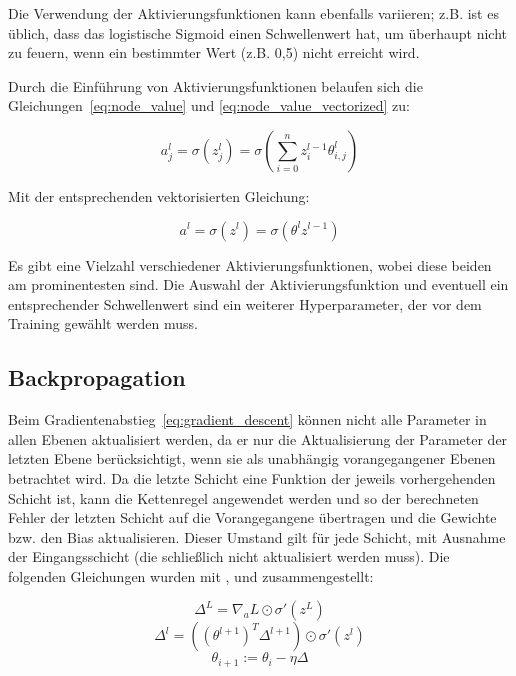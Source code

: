 Die Verwendung der Aktivierungsfunktionen kann ebenfalls variieren; z.B. ist es üblich, dass das logistische Sigmoid einen Schwellenwert hat, um überhaupt nicht zu feuern, wenn ein bestimmter Wert (z.B. 0,5) nicht erreicht wird.

Durch die Einführung von Aktivierungsfunktionen belaufen sich die Gleichungen~\eqref{eq:node_value} und \eqref{eq:node_value_vectorized} zu:

\begin{equation}
    a^l_j = \sigma(z^l_j) = \sigma(\sum^n_{i=0}z^{l-1}_i\theta^l_{i, j})
    \label{eq:activation}
\end{equation}

Mit der entsprechenden vektorisierten Gleichung:

\begin{equation}
    a^l = \sigma(z^l) = \sigma(\theta^l z^{l-1})
    \label{eq:activation_vectorized}
\end{equation}

Es gibt eine Vielzahl verschiedener Aktivierungsfunktionen, wobei diese beiden am prominentesten sind.
Die Auswahl der Aktivierungsfunktion und eventuell ein entsprechender Schwellenwert sind ein weiterer Hyperparameter, der vor dem Training gewählt werden muss.

\subsection{Backpropagation}

Beim Gradientenabstieg~\eqref{eq:gradient_descent} können nicht alle Parameter in allen Ebenen aktualisiert werden, da er nur die Aktualisierung der Parameter der letzten Ebene berücksichtigt, wenn sie als unabhängig vorangegangener Ebenen betrachtet wird.
Da die letzte Schicht eine Funktion der jeweils vorhergehenden Schicht ist, kann die Kettenregel angewendet werden und so der berechneten Fehler der letzten Schicht auf die Vorangegangene übertragen und die Gewichte bzw. den Bias aktualisieren. Dieser Umstand gilt für jede Schicht, mit Ausnahme der Eingangsschicht (die schließlich nicht aktualisiert werden muss).
Die folgenden Gleichungen wurden mit \cite[S.733]{StuartRussell2018}, \cite[S.197]{Goodfellow2017} und \cite[ch.2]{Nielsen2015} zusammengestellt:

\begin{equation}
    \varDelta^L = \nabla_a L \odot \sigma'(z^L)
    \label{eq:output_error}
\end{equation}
\begin{equation}
    \varDelta^l = ((\theta^{l+1})^T \varDelta^{l+1}) \odot \sigma'(z^l)
    \label{eq:hidden_error}
\end{equation}
\begin{equation}
    \theta_{i+1} := \theta_i - \eta \varDelta
    \label{eq:backprop_update}
\end{equation}

